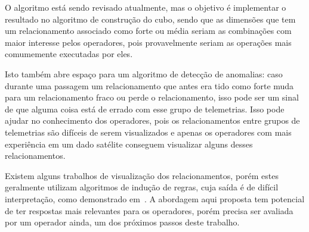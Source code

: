 O algoritmo está sendo revisado atualmente, mas o objetivo é implementar o resultado no algoritmo de construção do cubo, sendo que as dimensões que tem um relacionamento associado como forte ou média seriam as combinações com maior interesse pelos operadores, pois provavelmente seriam as operações mais comumemente executadas por eles.

Isto também abre espaço para um algoritmo de detecção de anomalias: caso durante uma passagem um relacionamento que antes era tido como forte muda para um relacionamento fraco ou perde o relacionamento, isso pode ser um sinal de que alguma coisa está de errado com esse grupo de telemetrias.
Isso pode ajudar no conhecimento dos operadores, pois os relacionamentos entre grupos de telemetrias são difíceis de serem visualizados e apenas os operadores com mais experiência em um dado satélite conseguem visualizar alguns desses relacionamentos.

Existem alguns trabalhos de visualização dos relacionamentos, porém estes geralmente utilizam algoritmos de indução de regras, cuja saída é de difícil interpretação, como demonstrado em~\cite{kannanMiningSatelliteTelemetry2016}.
A abordagem aqui proposta tem potencial de ter respostas mais relevantes para os operadores, porém precisa ser avaliada por um operador ainda, um dos próximos passos deste trabalho.

